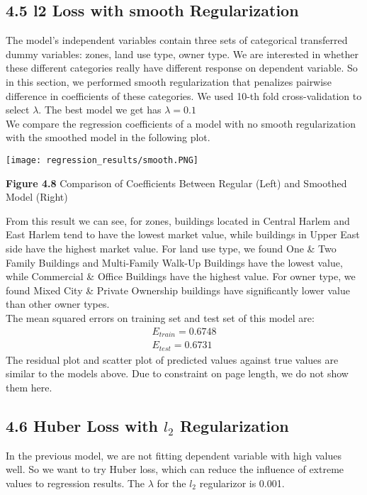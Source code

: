 \documentclass[9pt,twocolumn,twoside]{pnas-new}
\begin{document}
\subsection*{4.5 l2 Loss with smooth Regularization}
The model's independent variables contain three sets of categorical transferred dummy variables: zones, land use type, owner type. We are interested in whether these different categories really have different response on dependent variable. So in this section, we performed smooth regularization that penalizes pairwise difference in coefficients of these categories. We used 10-th fold cross-validation to select $\lambda$.  The best model we get has  $\lambda = 0.1$\\
\linebreak
\noindent We compare the regression coefficients of a model with no smooth regularization with the smoothed model in the following plot.

\texttt{[image: regression\_results/smooth.PNG]} 
\begin{center}
\textbf{Figure 4.8} Comparison of Coefficients Between Regular (Left) and Smoothed Model (Right)
\end{center}

\noindent From this result we can see, for zones, buildings located in Central Harlem and East Harlem tend to have the lowest market value, while buildings in Upper East side have the highest market value. For land use type, we found One \& Two Family Buildings and Multi-Family Walk-Up Buildings have the lowest value, while Commercial \& Office Buildings have the highest value. For owner type,  we found Mixed City \& Private Ownership buildings have significantly lower value than other owner types.\\

\noindent The mean squared errors on training set and test set of this model are:
\begin{align*}
E_{train} = 0.6748\\
E_{test} = 0.6731
\end{align*}
The residual plot and scatter plot of predicted values against true values are similar to the models above. Due to constraint on page length, we do not show them here. 





\subsection*{4.6 Huber Loss with $l_{2}$ Regularization}
In the previous model, we are not fitting dependent variable with high values well. So we want to try Huber loss, which can reduce the influence of extreme values to regression results. The $\lambda$ for the $l_{2}$ regularizor is 0.001.
\end{document}

